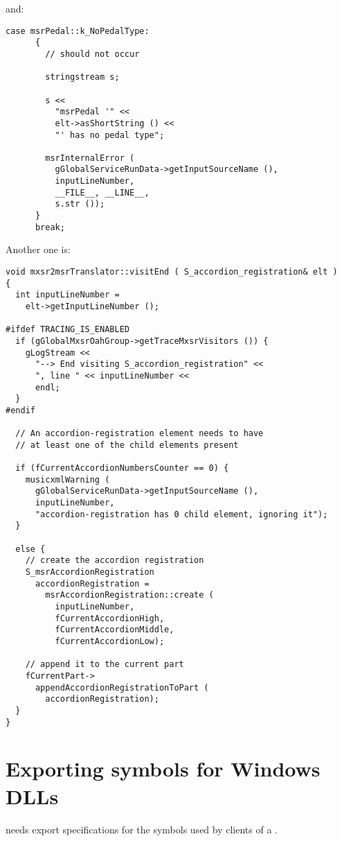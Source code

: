 and:
\begin{lstlisting}[language=CPlusPlus]
    case msrPedal::k_NoPedalType:
      {
        // should not occur

        stringstream s;

        s <<
          "msrPedal '" <<
          elt->asShortString () <<
          "' has no pedal type";

        msrInternalError (
          gGlobalServiceRunData->getInputSourceName (),
          inputLineNumber,
          __FILE__, __LINE__,
          s.str ());
      }
      break;
\end{lstlisting}

Another one is:
\begin{lstlisting}[language=CPlusPlus]
void mxsr2msrTranslator::visitEnd ( S_accordion_registration& elt )
{
  int inputLineNumber =
    elt->getInputLineNumber ();

#ifdef TRACING_IS_ENABLED
  if (gGlobalMxsrOahGroup->getTraceMxsrVisitors ()) {
    gLogStream <<
      "--> End visiting S_accordion_registration" <<
      ", line " << inputLineNumber <<
      endl;
  }
#endif

  // An accordion-registration element needs to have
  // at least one of the child elements present

  if (fCurrentAccordionNumbersCounter == 0) {
    musicxmlWarning (
      gGlobalServiceRunData->getInputSourceName (),
      inputLineNumber,
      "accordion-registration has 0 child element, ignoring it");
  }

  else {
    // create the accordion registration
    S_msrAccordionRegistration
      accordionRegistration =
        msrAccordionRegistration::create (
          inputLineNumber,
          fCurrentAccordionHigh,
          fCurrentAccordionMiddle,
          fCurrentAccordionLow);

    // append it to the current part
    fCurrentPart->
      appendAccordionRegistrationToPart (
        accordionRegistration);
  }
}
\end{lstlisting}


\section{Exporting symbols for Windows DLLs}

 needs export specifications for the symbols used by clients of a .


